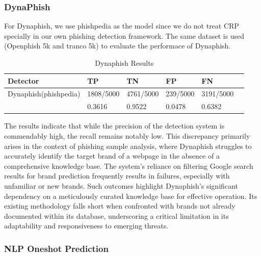 \subsubsection{DynaPhish \cite{liu2023knowledge}}

For Dynaphish, we use phishpedia as the model since we do not treat CRP specially in our own phishing detection framework. The same dataset is used (Openphish 5k and tranco 5k) to evaluate the performace of Dynaphish.

\begin{table}[h!]
  \centering
    \caption{Dynaphish Results}
  \begin{tabular}{p{4cm}p{2.5cm}p{2.5cm}p{2.5cm}p{2.5cm}p{2.5cm}}
    \textbf{Detector} & \textbf{TP} & \textbf{TN} & \textbf{FP} & \textbf{FN} \\ %
    \midrule %
    Dynaphish(phishpedia) & 1808/5000 & 4761/5000 & 239/5000 & 3191/5000 \\ %
    & 0.3616 & 0.9522 & 0.0478 & 0.6382 \\ %
  \end{tabular}

  \label{tab:my_label}
\end{table}

The results indicate that while the precision of the detection system is commendably high, the recall remains notably low. This discrepancy primarily arises in the context of phishing sample analysis, where Dynaphish struggles to accurately identify the target brand of a webpage in the absence of a comprehensive knowledge base. The system's reliance on filtering Google search results for brand prediction frequently results in failures, especially with unfamiliar or new brands. Such outcomes highlight Dynaphish's significant dependency on a meticulously curated knowledge base for effective operation. Its existing methodology falls short when confronted with brands not already documented within its database, underscoring a critical limitation in its adaptability and responsiveness to emerging threats.

\subsubsection{NLP Oneshot Prediction \cite{li2024knowphish}}

